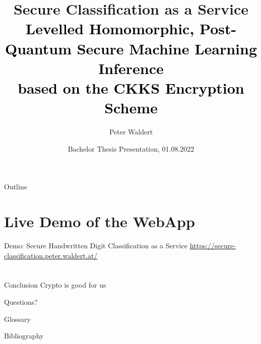 \documentclass[aspectratio=169]{beamer}
\title[Secure Classification as a Service]{
  Secure Classification as a Service \\
  \small\normalfont\textcolor{black}{
    Levelled Homomorphic, Post-Quantum Secure Machine Learning Inference \\
    based on the CKKS Encryption Scheme
  }
}
\author{Peter Waldert}
\date{Bachelor Thesis Presentation, 01.08.2022}
\institute{IAIK}
\begin{document}
  \begin{frame}[plain]
    \maketitle
  \end{frame}

  \begin{frame}{Outline}
    \tableofcontents
  \end{frame}

  
  
  
  

  \section{Live Demo of the WebApp}
  \begin{frame}{Demo: Secure Handwritten Digit Classification as a Service}
    \url{https://secure-classification.peter.waldert.at/}
  \end{frame}

  

  \section*{}
  \begin{frame}{Conclusion}
    Crypto is good for us
  \end{frame}

  \begin{frame}[c]
    \centering
    \Large Questions?
  \end{frame}

  \begin{frame}[allowframebreaks]{Glossary}
    \printnoidxglossary[type=acronym]
  \end{frame}

  \begin{frame}[allowframebreaks]{Bibliography}
    \printbibliography
  \end{frame}

  
\end{document}
